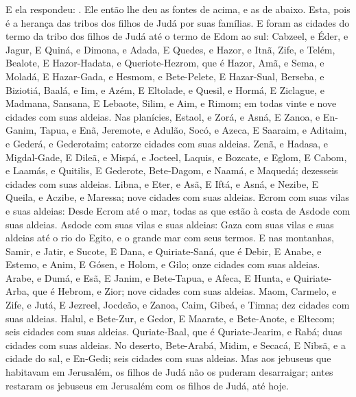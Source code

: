{E ela respondeu: . Ele então lhe deu as fontes de acima, e as de abaixo.
Esta, pois é a herança das tribos dos filhos de Judá por suas famílias.
E foram as cidades do termo da tribo dos filhos de Judá até o termo de Edom ao sul: Cabzeel, e Éder, e Jagur,
E Quiná, e Dimona, e Adada,
E Quedes, e Hazor, e Itnã,
Zife, e Telém, Bealote,
E Hazor-Hadata, e Queriote-Hezrom, que é Hazor,
Amã, e Sema, e Moladá,
E Hazar-Gada, e Hesmom, e Bete-Pelete,
E Hazar-Sual, Berseba, e Biziotiá,
Baalá, e Iim, e Azém,
E Eltolade, e Quesil, e Hormá,
E Ziclague, e Madmana, Sansana,
E Lebaote, Silim, e Aim, e Rimom; em todas vinte e nove cidades com suas aldeias.
Nas planícies, Estaol, e Zorá, e Asná,
E Zanoa, e En-Ganim, Tapua, e Enã,
Jeremote, e Adulão, Socó, e Azeca,
E Saaraim, e Aditaim, e Gederá, e Gederotaim; catorze cidades com suas aldeias.
Zenã, e Hadasa, e Migdal-Gade,
E Dileã, e Mispá, e Jocteel,
Laquis, e Bozcate, e Eglom,
E Cabom, e Laamás, e Quitilis,
E Gederote, Bete-Dagom, e Naamá, e Maquedá; dezesseis cidades com suas aldeias.
Libna, e Eter, e Asã,
E Iftá, e Asná, e Nezibe,
E Queila, e Aczibe, e Maressa; nove cidades com suas aldeias.
Ecrom com suas vilas e suas aldeias:
Desde Ecrom até o mar, todas as que estão à costa de Asdode com suas aldeias.
Asdode com suas vilas e suas aldeias: Gaza com suas vilas e suas aldeias até o rio do Egito, e o grande mar com seus termos.
E nas montanhas, Samir, e Jatir, e Sucote,
E Dana, e Quiriate-Saná, que é Debir,
E Anabe, e Estemo, e Anim,
E Gósen, e Holom, e Gilo; onze cidades com suas aldeias.
Arabe, e Dumá, e Esã,
E Janim, e Bete-Tapua, e Afeca,
E Hunta, e Quiriate-Arba, que é Hebrom, e Zior; nove cidades com suas aldeias.
Maom, Carmelo, e Zife, e Jutá,
E Jezreel, Jocdeão, e Zanoa,
Caim, Gibeá, e Timna; dez cidades com suas aldeias.
Halul, e Bete-Zur, e Gedor,
E Maarate, e Bete-Anote, e Eltecom; seis cidades com suas aldeias.
Quriate-Baal, que é Quriate-Jearim, e Rabá; duas cidades com suas aldeias.
No deserto, Bete-Arabá, Midim, e Secacá,
E Nibsã, e a cidade do sal, e En-Gedi; seis cidades com suas aldeias.
Mas aos jebuseus que habitavam em Jerusalém, os filhos de Judá não os puderam desarraigar; antes restaram os jebuseus em Jerusalém com os filhos de Judá, até hoje.

\par }

